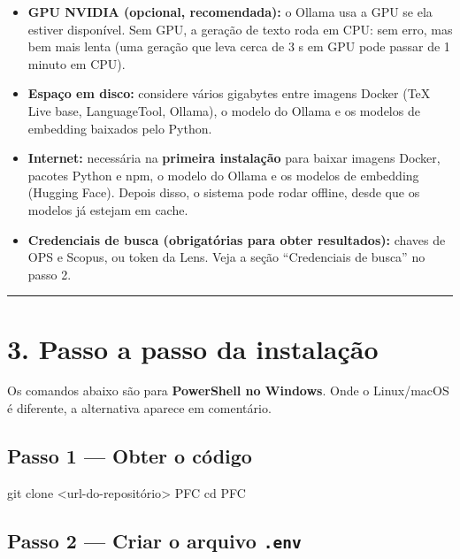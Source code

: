 \documentclass[
  brazilian,
  a4paper,12pt,oneside]{report}
\newenvironment{Shaded}{}{}
\newcommand{\FunctionTok}[1]{\textcolor[rgb]{0.02,0.16,0.49}{#1}}
\newcommand{\NormalTok}[1]{#1}
\newcommand{\OperatorTok}[1]{\textcolor[rgb]{0.40,0.40,0.40}{#1}}
\providecommand{\tightlist}{%
  \setlength{\itemsep}{0pt}\setlength{\parskip}{0pt}}
\begin{document}
\begin{itemize}
\tightlist
\item
  \textbf{GPU NVIDIA (opcional, recomendada):} o Ollama usa a GPU se ela
  estiver disponível. Sem GPU, a geração de texto roda em CPU: sem erro,
  mas bem mais lenta (uma geração que leva cerca de 3 s em GPU pode
  passar de 1 minuto em CPU).
\item
  \textbf{Espaço em disco:} considere vários gigabytes entre imagens
  Docker (TeX Live base, LanguageTool, Ollama), o modelo do Ollama e os
  modelos de embedding baixados pelo Python.
\item
  \textbf{Internet:} necessária na \textbf{primeira instalação} para
  baixar imagens Docker, pacotes Python e npm, o modelo do Ollama e os
  modelos de embedding (Hugging Face). Depois disso, o sistema pode
  rodar offline, desde que os modelos já estejam em cache.
\item
  \textbf{Credenciais de busca (obrigatórias para obter resultados):}
  chaves de OPS e Scopus, ou token da Lens. Veja a seção ``Credenciais
  de busca'' no passo 2.
\end{itemize}

\begin{center}\rule{0.5\linewidth}{0.5pt}\end{center}

\chapter{3. Passo a passo da
instalação}\label{passo-a-passo-da-instalauxe7uxe3o}

Os comandos abaixo são para \textbf{PowerShell no Windows}. Onde o
Linux/macOS é diferente, a alternativa aparece em comentário.

\section{Passo 1 --- Obter o código}\label{passo-1-obter-o-cuxf3digo}

\begin{Shaded}
\begin{Highlighting}[]
\NormalTok{git clone }\OperatorTok{\textless{}}\NormalTok{url{-}do{-}repositório}\OperatorTok{\textgreater{}}\NormalTok{ PFC}
\FunctionTok{cd}\NormalTok{ PFC}
\end{Highlighting}
\end{Shaded}

\section{\texorpdfstring{Passo 2 --- Criar o arquivo
\texttt{.}\allowbreak{}\texttt{env}}{Passo 2 --- Criar o arquivo .env}}\label{passo-2-criar-o-arquivo-.env}
\end{document}
